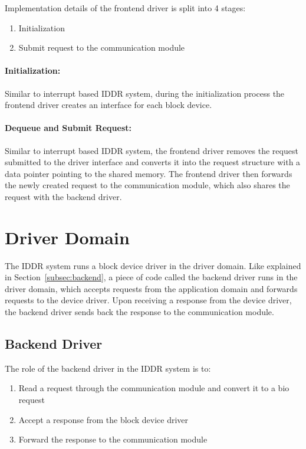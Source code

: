 Implementation details of the frontend driver is split into 4 stages:
\begin{enumerate}
\item Initialization
\item Submit request to the communication module
\end{enumerate}

\paragraph{Initialization:}
Similar to interrupt based IDDR system, during the initialization process the frontend driver creates an interface for each block device.

\paragraph{Dequeue and Submit Request:}
Similar to interrupt based IDDR system, the frontend driver removes the
request submitted to the driver interface and converts it into the request
structure with a data pointer pointing to the shared memory. The frontend
driver then forwards the newly created request to the communication
module, which also shares the request with the backend driver.

\section{Driver Domain}
The IDDR system runs a block device driver in the driver domain. Like
explained in Section~\ref{subsec:backend}, a piece of code called the
backend driver runs in the driver domain, which accepts requests from
the application domain and forwards requests to the device driver. Upon
receiving a response from the device driver, the backend driver sends
back the response to the communication module.

\subsection*{Backend Driver}
The role of the backend driver in the IDDR system is to:
\begin{enumerate}
\item Read a request through the communication module and convert it to a bio request
\item Accept a response from the block device driver
\item Forward the response to the communication module
\end{enumerate}

